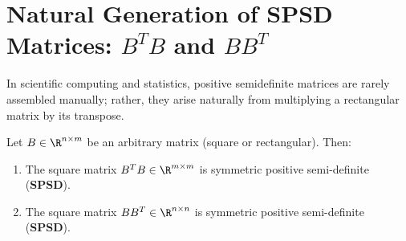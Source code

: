 \FloatBarrier
\section[Natural Generation of SPSD Matrices]{Natural Generation of SPSD Matrices: \texorpdfstring{$B^T B$}{B\textasciicircum T B} and \texorpdfstring{$B B^T$}{B B\textasciicircum T}}

In scientific computing and statistics, positive semidefinite matrices are rarely assembled manually; rather, they arise naturally from multiplying a rectangular matrix by its transpose.

\begin{proposition}
\label{prop:btb-bbt-spsd-en}
Let $B \in \R^{n \times m}$ be an arbitrary matrix (square or rectangular). Then:
\begin{enumerate}
    \item The square matrix $B^T B \in \R^{m \times m}$ is symmetric positive semi-definite (\textbf{SPSD}).
    \item The square matrix $B B^T \in \R^{n \times n}$ is symmetric positive semi-definite (\textbf{SPSD}).
\end{enumerate}
\end{proposition}

